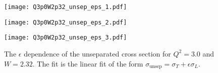 \begin{figure}
  \centering
  \begin{minipage}[b]{0.48\linewidth}
    \texttt{[image: Q3p0W2p32\_unsep\_eps\_1.pdf]}
  \end{minipage}
  \hfill
  \begin{minipage}[b]{0.48\linewidth}
    \texttt{[image: Q3p0W2p32\_unsep\_eps\_2.pdf]}
  \end{minipage}
  \begin{minipage}[b]{0.48\linewidth}
    \texttt{[image: Q3p0W2p32\_unsep\_eps\_3.pdf]}
  \end{minipage}
  \caption{The $\epsilon$ dependence of the unseparated cross section for $Q^2=3.0$ and $W=2.32$. The fit is the linear fit of the form $\sigma_{\mathrm{unsep}}=\sigma_T+\epsilon\sigma_L$.}
  \label{fig:Q3p0W2p32_unsep_eps}
\end{figure}

